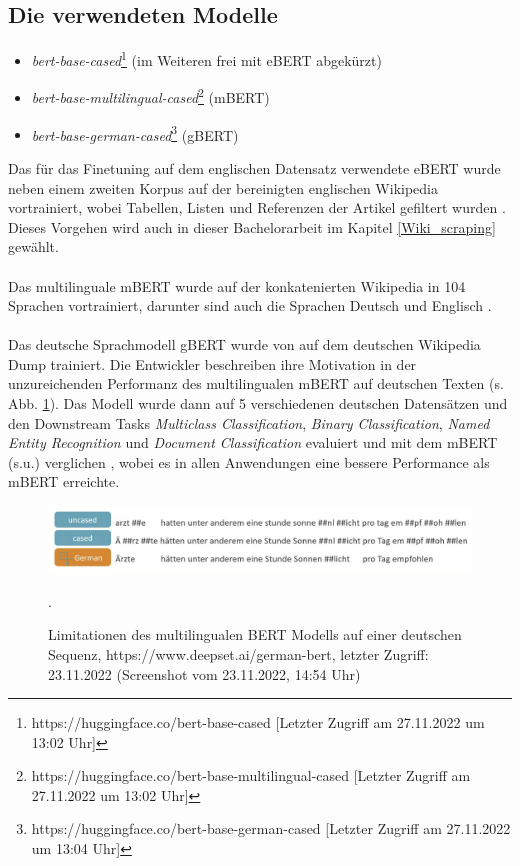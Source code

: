 \documentclass[ngerman]{ttlab-qualify}
\begin{document}
\subsection{Die verwendeten Modelle}
\begin{itemize}
    \item \textit{bert-base-cased}\footnote{https://huggingface.co/bert-base-cased [Letzter Zugriff am 27.11.2022 um 13:02 Uhr]} (im Weiteren frei mit eBERT abgekürzt)
    \item \textit{bert-base-multilingual-cased}\footnote{https://huggingface.co/bert-base-multilingual-cased [Letzter Zugriff am 27.11.2022 um 13:02 Uhr]} (mBERT) 
    \item \textit{bert-base-german-cased}\footnote{https://huggingface.co/bert-base-german-cased [Letzter Zugriff am 27.11.2022 um 13:04 Uhr]} (gBERT)
\end{itemize}
Das für das Finetuning auf dem englischen Datensatz verwendete eBERT wurde neben einem zweiten Korpus auf der bereinigten englischen Wikipedia vortrainiert, wobei Tabellen, Listen und Referenzen der Artikel gefiltert wurden \parencite{devlin-etal-2019-bert}. Dieses Vorgehen wird auch in dieser Bachelorarbeit im Kapitel \ref{Wiki_scraping} gewählt.\\
\\
Das multilinguale mBERT wurde auf der konkatenierten Wikipedia in 104 Sprachen vortrainiert, darunter sind auch die Sprachen Deutsch und Englisch \parencite{bert_multi}.\\
\\
Das deutsche Sprachmodell gBERT wurde von \textcite{gBERT} auf dem deutschen Wikipedia Dump trainiert. Die Entwickler beschreiben ihre Motivation in der unzureichenden Performanz des multilingualen mBERT auf deutschen Texten (s. Abb. \ref{G_vs_M}).
Das Modell wurde dann auf 5 verschiedenen deutschen Datensätzen und den Downstream Tasks \textit{Multiclass Classification}, \textit{Binary Classification}, \textit{Named Entity Recognition} und \textit{Document Classification} evaluiert und mit dem mBERT (s.u.) verglichen \parencite{gBERT}, wobei es in allen Anwendungen eine bessere Performance als mBERT erreichte.
\begin{figure}[H]
\begin{center}
\includegraphics[width=15cm]{grafiken/gBERT.png}
\caption[Limitationen des multilingualen BERT Modells auf einer deutschen Sequenz]{Limitationen des multilingualen BERT Modells auf einer deutschen Sequenz, https://www.deepset.ai/german-bert, letzter Zugriff: 23.11.2022 (Screenshot vom 23.11.2022, 14:54 Uhr)}.
\label{G_vs_M}
\end{center}
\end{figure} 
\end{document}
